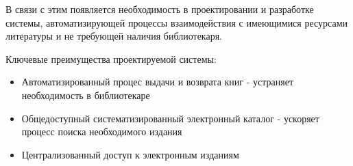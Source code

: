 \documentclass[./intro.tex]{subfiles}
\begin{document}
\par
В связи с этим появляется необходимость в проектировании и разработке системы, автоматизирующей процессы взаимодействия с имеющимися ресурсами литературы и не требующей наличия библиотекаря.
\par
Ключевые преимущества проектируемой системы:
\begin{itemize}
    \item Автоматизированный процес выдачи и возврата книг - устраняет необходимость в библиотекаре
    \item Общедоступный систематизированный электронный каталог - ускоряет процесс поиска необходимого издания
    \item Централизованный доступ к электронным изданиям
\end{itemize}
\end{document}
